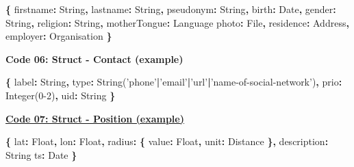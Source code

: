 \documentclass[12pt,english,a4paper,titlepage,cleardoublepage=empty,dottedtoc]{report}
\newenvironment{Shaded}{\begin{snugshade}}{\end{snugshade}}
\newcommand{\DataTypeTok}[1]{\textcolor[rgb]{0.13,0.29,0.53}{{#1}}}
\newcommand{\DecValTok}[1]{\textcolor[rgb]{0.00,0.00,0.81}{{#1}}}
\newcommand{\StringTok}[1]{\textcolor[rgb]{0.31,0.60,0.02}{{#1}}}
\newcommand{\OperatorTok}[1]{\textcolor[rgb]{0.81,0.36,0.00}{\textbf{{#1}}}}
\newcommand{\AttributeTok}[1]{\textcolor[rgb]{0.77,0.63,0.00}{{#1}}}
\newcommand{\NormalTok}[1]{{#1}}
\begin{document}
\begin{Shaded}
\begin{Highlighting}[numbers=left,,]
\OperatorTok{\{}
    \DataTypeTok{firstname}\OperatorTok{:} \NormalTok{String}\OperatorTok{,}
    \DataTypeTok{lastname}\OperatorTok{:} \NormalTok{String}\OperatorTok{,}
    \DataTypeTok{pseudonym}\OperatorTok{:} \NormalTok{String}\OperatorTok{,}
    \DataTypeTok{birth}\OperatorTok{:} \NormalTok{Date}\OperatorTok{,}
    \DataTypeTok{gender}\OperatorTok{:} \NormalTok{String}\OperatorTok{,}
    \DataTypeTok{religion}\OperatorTok{:} \NormalTok{String}\OperatorTok{,}
    \DataTypeTok{motherTongue}\OperatorTok{:} \NormalTok{Language}
    \DataTypeTok{photo}\OperatorTok{:} \NormalTok{File}\OperatorTok{,}
    \DataTypeTok{residence}\OperatorTok{:} \NormalTok{Address}\OperatorTok{,}
    \DataTypeTok{employer}\OperatorTok{:} \NormalTok{Organisation}
\OperatorTok{\}}
\end{Highlighting}
\end{Shaded}

\textbf{\protect\hypertarget{code-06_struct_contact}{}{Code 06: Struct -
Contact (example)}}

\begin{Shaded}
\begin{Highlighting}[numbers=left,,]
\OperatorTok{\{}
    \DataTypeTok{label}\OperatorTok{:} \NormalTok{String}\OperatorTok{,}
    \DataTypeTok{type}\OperatorTok{:} \AttributeTok{String}\NormalTok{(}\StringTok{'phone'}\OperatorTok{|}\StringTok{'email'}\OperatorTok{|}\StringTok{'url'}\OperatorTok{|}\StringTok{'name-of-social-network'}\NormalTok{)}\OperatorTok{,}
    \DataTypeTok{prio}\OperatorTok{:} \AttributeTok{Integer}\NormalTok{(}\DecValTok{0-2}\NormalTok{)}\OperatorTok{,}
    \DataTypeTok{uid}\OperatorTok{:} \NormalTok{String}
\OperatorTok{\}}
\end{Highlighting}
\end{Shaded}

\textbf{\protect\hyperlink{code-07_struct_position}{Code 07: Struct -
Position (example)}}

\begin{Shaded}
\begin{Highlighting}[numbers=left,,]
\OperatorTok{\{}
    \DataTypeTok{lat}\OperatorTok{:} \NormalTok{Float}\OperatorTok{,}
    \DataTypeTok{lon}\OperatorTok{:} \NormalTok{Float}\OperatorTok{,}
    \DataTypeTok{radius}\OperatorTok{:} \OperatorTok{\{}
        \DataTypeTok{value}\OperatorTok{:} \NormalTok{Float}\OperatorTok{,}
        \DataTypeTok{unit}\OperatorTok{:} \NormalTok{Distance}
    \OperatorTok{\},}
    \DataTypeTok{description}\OperatorTok{:} \NormalTok{String}
    \DataTypeTok{ts}\OperatorTok{:} \NormalTok{Date}
\OperatorTok{\}}
\end{Highlighting}
\end{Shaded}
\end{document}
